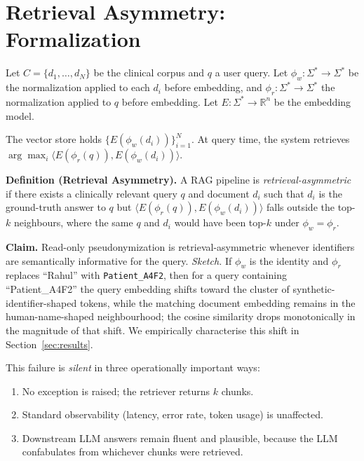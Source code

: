\documentclass[11pt,a4paper]{article}
\begin{document}
\section{Retrieval Asymmetry: Formalization}
\label{sec:asymmetry}

Let $C = \{d_1, \ldots, d_N\}$ be the clinical corpus and $q$ a user query.
Let $\phi_w : \Sigma^* \to \Sigma^*$ be the normalization applied to each
$d_i$ before embedding, and $\phi_r : \Sigma^* \to \Sigma^*$ the
normalization applied to $q$ before embedding. Let $E : \Sigma^* \to
\mathbb{R}^n$ be the embedding model.

The vector store holds $\{E(\phi_w(d_i))\}_{i=1}^N$. At query time, the
system retrieves
$\arg\max_{i} \langle E(\phi_r(q)), E(\phi_w(d_i)) \rangle$.

\textbf{Definition (Retrieval Asymmetry).} A RAG pipeline is
\emph{retrieval-asymmetric} if there exists a clinically relevant query $q$
and document $d_i$ such that $d_i$ is the ground-truth answer to $q$ but
$\langle E(\phi_r(q)), E(\phi_w(d_i)) \rangle$ falls outside the top-$k$
neighbours, where the same $q$ and $d_i$ would have been top-$k$ under
$\phi_w = \phi_r$.

\textbf{Claim.} Read-only pseudonymization is retrieval-asymmetric whenever
identifiers are semantically informative for the query. \emph{Sketch.} If
$\phi_w$ is the identity and $\phi_r$ replaces ``Rahul'' with
\texttt{Patient\_A4F2}, then for a query containing ``Patient\_A4F2'' the
query embedding shifts toward the cluster of synthetic-identifier-shaped
tokens, while the matching document embedding remains in the
human-name-shaped neighbourhood; the cosine similarity drops monotonically
in the magnitude of that shift. We empirically characterise this shift in
Section~\ref{sec:results}.

This failure is \emph{silent} in three operationally important ways:

\begin{enumerate}
  \item No exception is raised; the retriever returns $k$ chunks.
  \item Standard observability (latency, error rate, token usage) is
        unaffected.
  \item Downstream LLM answers remain fluent and plausible, because the LLM
        confabulates from whichever chunks were retrieved.
\end{enumerate}
\end{document}
